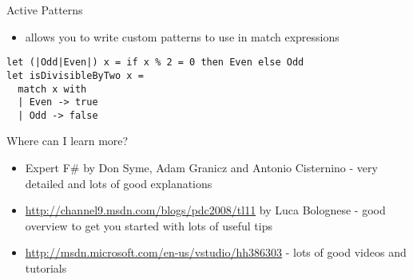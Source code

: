 \documentclass[landscape]{slides}
\begin{document}
\begin{slide}{Active Patterns}
\begin{itemize}
\item allows you to write custom patterns to use in match expressions
\end{itemize}
\begin{verbatim}
let (|Odd|Even|) x = if x % 2 = 0 then Even else Odd
let isDivisibleByTwo x = 
  match x with 
  | Even -> true 
  | Odd -> false
\end{verbatim}
\end{slide}

\begin{slide}{Where can I learn more?}
\begin{itemize}
\item Expert F\# by Don Syme, Adam Granicz and Antonio Cisternino - very detailed and lots of good explanations
\item \href{http://channel9.msdn.com/blogs/pdc2008/tl11}{http://channel9.msdn.com/blogs/pdc2008/tl11} by Luca Bolognese - good overview to get you started with lots of useful tips
\item \href{http://msdn.microsoft.com/en-us/vstudio/hh386303}{http://msdn.microsoft.com/en-us/vstudio/hh386303} - lots of good videos and tutorials
\end{itemize}
\end{slide}
\end{document}
